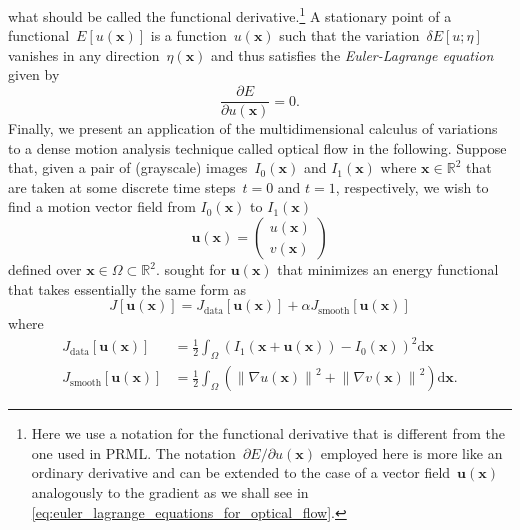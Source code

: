 \documentclass[12pt,a4paper]{article}
\begin{document}
what should be called the functional derivative.\footnote{Here we use a notation for
the functional derivative that is different from the one used in PRML.
The notation~$\partial E/\partial u(\mathbf{x})$ employed here is more like an ordinary derivative
and can be extended to the case of a vector field~$\mathbf{u}(\mathbf{x})$ analogously to
the gradient as we shall see in \eqref{eq:euler_lagrange_equations_for_optical_flow}.}
A stationary point of a functional~$E[u(\mathbf{x})]$ is a function~$u(\mathbf{x})$ such that
the variation~$\delta E[u; \eta]$ vanishes in any direction~$\eta(\mathbf{x})$ and thus
satisfies the \emph{Euler-Lagrange equation} given by
\begin{equation}
\frac{\partial E}{\partial u(\mathbf{x})} = 0 .
\label{eq:euler_lagrange_equation}
\end{equation}
Finally, we present an application of the multidimensional calculus of variations to
a dense motion analysis technique called optical flow in the following.
Suppose that, given a pair of (grayscale) images~$I_0(\mathbf{x})$ and $I_1(\mathbf{x})$
where $\mathbf{x} \in \mathbb{R}^{2}$ that are taken at
some discrete time steps~$t=0$ and $t=1$, respectively,
we wish to find a motion vector field from $I_0(\mathbf{x})$ to $I_1(\mathbf{x})$
\begin{equation}
\mathbf{u}(\mathbf{x}) =
\begin{pmatrix}
u(\mathbf{x}) \\
v(\mathbf{x})
\end{pmatrix}
\end{equation}
defined over $\mathbf{x} \in \Omega \subset \mathbb{R}^{2}$.
\citet{HornSchunck:OpticalFlow} sought for $\mathbf{u}(\mathbf{x})$ that minimizes
an energy functional that takes essentially the same form as
\begin{equation}
J[\mathbf{u}(\mathbf{x})] =
J_{\text{data}}[\mathbf{u}(\mathbf{x})] + \alpha J_{\text{smooth}}[\mathbf{u}(\mathbf{x})]
\label{eq:horn_schunck_optical_flow_functional}
\end{equation}
where
\begin{align}
J_{\text{data}}[\mathbf{u}(\mathbf{x})] &=
\frac{1}{2} \int_{\Omega} \left(
  I_1(\mathbf{x} + \mathbf{u}(\mathbf{x})) - I_0(\mathbf{x})
 \right)^2 \mathrm{d}\mathbf{x} \\
J_{\text{smooth}}[\mathbf{u}(\mathbf{x})] &=
\frac{1}{2} \int_{\Omega} \left (
  \left\| \nabla u(\mathbf{x}) \right\|^2 + \left\| \nabla v(\mathbf{x})\right\|^2
 \right) \mathrm{d}\mathbf{x} .
\end{align}
\end{document}
